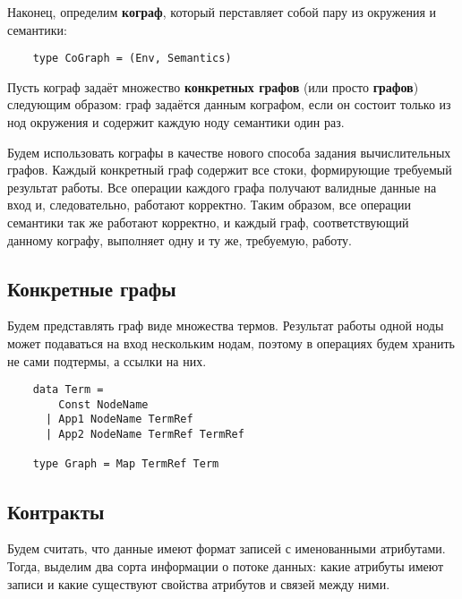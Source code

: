 Наконец, определим \textbf{кограф}, который перставляет собой пару из окружения и семантики:
\begin{lstlisting}
    type CoGraph = (Env, Semantics)
\end{lstlisting}

Пусть кограф задаёт множество \textbf{конкретных графов} (или просто \textbf{графов}) следующим образом:
граф задаётся данным кографом, если он состоит только из нод окружения и содержит каждую ноду семантики один раз.

Будем использовать кографы в качестве нового способа задания вычислительных графов.
Каждый конкретный граф содержит все стоки, формирующие требуемый результат работы.
Все операции каждого графа получают валидные данные на вход и, следовательно, работают корректно.
Таким образом, все операции семантики так же работают корректно, и каждый граф, соответствующий данному кографу, выполняет одну и ту же, требуемую, работу.

\subsection{Конкретные графы}

Будем представлять граф виде множества термов. Результат работы одной ноды может подаваться на вход нескольким нодам, поэтому в операциях будем хранить не сами подтермы, а ссылки на них.

\begin{lstlisting}
    data Term =
        Const NodeName
      | App1 NodeName TermRef
      | App2 NodeName TermRef TermRef

    type Graph = Map TermRef Term
\end{lstlisting}

\subsection{Контракты}

Будем считать, что данные имеют формат записей с именованными атрибутами.
Тогда, выделим два сорта информации о потоке данных: какие атрибуты имеют записи и какие существуют свойства атрибутов и связей между ними.

